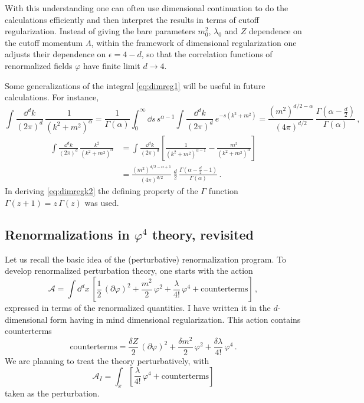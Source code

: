 With this understanding one can often use dimensional continuation to do the
calculations efficiently and then interpret the results in terms of cutoff
regularization. Instead of giving the bare parameters $m_0^2$, $\lambda_0$ and
$Z$ dependence on the cutoff momentum $\Lambda$, within the framework of
dimensional regularization one adjusts their dependence on $\epsilon=4-d$, so
that the correlation functions of renormalized fields $\varphi$ have finite
limit $d\to4$.

Some generalizations of the integral \eqref{eq:dimreg1} will be useful in
future calculations. For instance,
\begin{equation}\label{eq:dimregalpha}
\int\frac{\dd^dk}{(2\pi)^d}\,\frac1{(k^2+m^2)^\alpha}=\frac1{\Gamma(\alpha)}\int_0^\infty \dd s\,s^{\alpha-1}\int\frac{\dd^dk}{(2\pi)^d}\,e^{-s(k^2+m^2)}
=\frac{(m^2)^{d/2-\alpha}}{(4\pi)^{d/2}}\,\frac{\Gamma\left(\alpha-\frac d2\right)}{\Gamma(\alpha)}\,,
\end{equation}
\begin{equation}\label{eq:dimregk2}
\begin{split}
\int\frac{\dd^dk}{(2\pi)^d}\,\frac{k^2}{(k^2+m^2)^\alpha}&=\int\frac{\dd^dk}{(2\pi)^d}\left[\frac1{(k^2+m^2)^{\alpha-1}}-\frac{m^2}{(k^2+m^2)^\alpha}\right]\\
&=\frac{(m^2)^{d/2-\alpha+1}}{(4\pi)^{d/2}}\,\frac d2\,\frac{\Gamma\left(\alpha-\frac d2-1\right)}{\Gamma(\alpha)}\,.
\end{split}
\end{equation}
In deriving \eqref{eq:dimregk2} the defining property of the $\Gamma$ function
$\Gamma(z+1)=z\,\Gamma(z)$ was used.

\subsection*{Renormalizations in \texorpdfstring{$\varphi^4$}{phi**4} theory, revisited}

Let us recall the basic idea of the (perturbative) renormalization program. To
develop renormalized perturbation theory, one starts with the action
\[
\mathcal A=\int \dd^dx\,\left[\frac12\,(\partial\varphi)^2+\frac{m^2}2\,\varphi^2+\frac\lambda{4!}\,\varphi^4+\text{counterterms}\right]\,,
\]
expressed in terms of the renormalized quantities. I have written it in the
$d$-dimensional form having in mind dimensional regularization. This action
contains counterterms
\[
\text{counterterms}=\frac{\delta Z}2\,(\partial\varphi)^2+\frac{\delta m^2}2\,\varphi^2+\frac{\delta\lambda}{4!}\,\varphi^4\,.
\]
We are planning to treat the theory perturbatively, with
\[
\mathcal A_I=\int_x\left[\frac\lambda{4!}\,\varphi^4+\text{counterterms}\right]
\]
taken as the perturbation.

